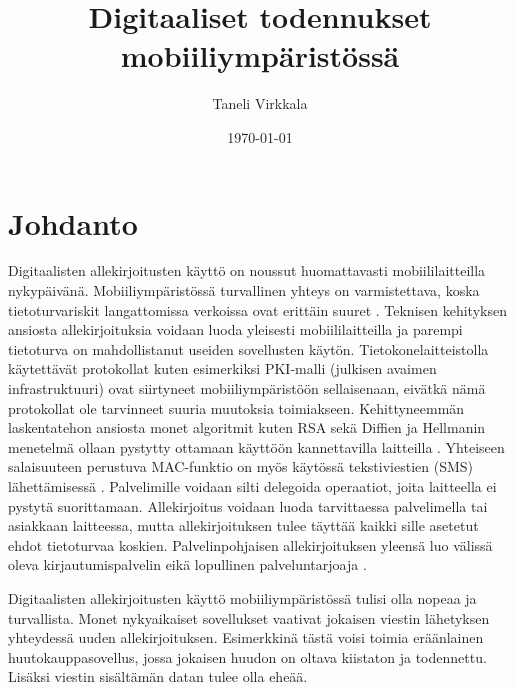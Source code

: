 \documentclass[finnish]{tktltiki2}
\title{Digitaaliset todennukset mobiiliympäristössä}
\author{Taneli Virkkala}
\date{\today}
\theoremstyle{definition}
\theoremstyle{remark}
\begin{document}

\frontmatter      %

\maketitle        %
\makeabstract     %

\tableofcontents  %


\mainmatter       %

\section{Johdanto}


Digitaalisten allekirjoitusten käyttö on noussut huomattavasti mobiililaitteilla nykypäivänä. Mobiiliympäristössä turvallinen yhteys on varmistettava, koska tietoturvariskit langattomissa verkoissa ovat erittäin suuret \cite{enti}. Teknisen kehityksen ansiosta allekirjoituksia voidaan luoda yleisesti mobiililaitteilla ja parempi tietoturva on mahdollistanut useiden sovellusten käytön. Tietokonelaitteistolla käytettävät protokollat kuten esimerkiksi PKI-malli (julkisen avaimen infrastruktuuri) ovat siirtyneet mobiiliympäristöön sellaisenaan, eivätkä nämä protokollat ole tarvinneet suuria muutoksia toimiakseen. Kehittyneemmän laskentatehon ansiosta monet algoritmit kuten RSA sekä Diffien ja Hellmanin menetelmä ollaan pystytty ottamaan käyttöön kannettavilla laitteilla \cite{enti}. Yhteiseen salaisuuteen perustuva MAC-funktio on myös käytössä tekstiviestien (SMS) lähettämisessä \cite{MAC}. Palvelimille voidaan silti delegoida operaatiot, joita laitteella ei pystytä suorittamaan. Allekirjoitus voidaan luoda tarvittaessa palvelimella tai asiakkaan laitteessa, mutta allekirjoituksen tulee täyttää kaikki sille asetetut ehdot tietoturvaa koskien. Palvelinpohjaisen allekirjoituksen yleensä luo välissä oleva kirjautumispalvelin eikä lopullinen palveluntarjoaja \cite{proxy}.

Digitaalisten allekirjoitusten käyttö mobiiliympäristössä tulisi olla nopeaa ja turvallista. Monet nykyaikaiset sovellukset vaativat jokaisen viestin lähetyksen yhteydessä uuden allekirjoituksen. Esimerkkinä tästä voisi toimia eräänlainen huutokauppasovellus, jossa jokaisen huudon on oltava kiistaton ja todennettu. Lisäksi viestin sisältämän datan tulee olla eheää. \cite{proxy}
\end{document}
